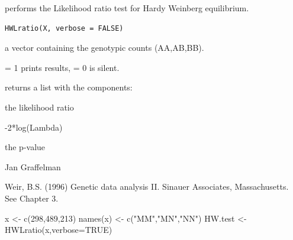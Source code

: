 \documentclass[a4paper]{article}
\begin{document}
\begin{Description}\relax
{} performs the Likelihood ratio test for Hardy Weinberg equilibrium.
\end{Description}
\begin{Usage}
\begin{verbatim}
HWLratio(X, verbose = FALSE)
\end{verbatim}
\end{Usage}
\begin{Arguments}
\begin{ldescription}
\item[\code{X}]  a vector containing the genotypic counts (AA,AB,BB).
\item[\code{verbose}]  = 1 prints results,  = 0 is silent.
\end{ldescription}
\end{Arguments}
\begin{Value}
 returns a list with the components:
\begin{ldescription}
\item[\code{Lambda }] the likelihood ratio
\item[\code{G2 }] -2*log(Lambda)
\item[\code{pval}] the p-value
\end{ldescription}
\end{Value}
\begin{Author}\relax
Jan Graffelman 
\end{Author}
\begin{References}\relax
Weir, B.S. (1996) Genetic data analysis II. Sinauer Associates, Massachusetts. See Chapter 3.
\end{References}
\begin{SeeAlso}\relax
{}
\end{SeeAlso}
\begin{Examples}
\begin{ExampleCode}
x <- c(298,489,213)
names(x) <- c("MM","MN","NN")
HW.test <- HWLratio(x,verbose=TRUE)
\end{ExampleCode}
\end{Examples}
\end{document}

